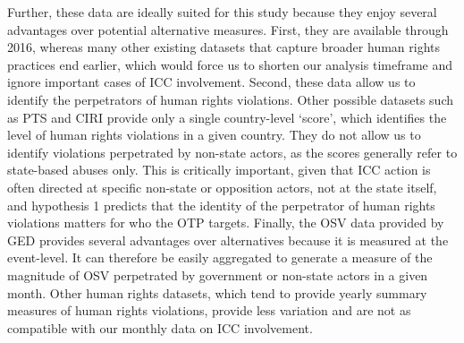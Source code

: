 Further, these data are ideally suited for this study because they enjoy several advantages over potential alternative measures. First, they are available through 2016, whereas many other existing datasets that capture broader human rights practices end earlier, which would force us to shorten our analysis timeframe and ignore important cases of ICC involvement. Second, these data allow us to identify the perpetrators of human rights violations. Other possible datasets such as PTS and CIRI provide only a single country-level `score', which identifies the level of human rights violations in a given country. They do not allow us to identify violations perpetrated by non-state actors, as the scores generally refer to state-based abuses only. This is critically important, given that ICC action is often directed at specific non-state or opposition actors, not at the state itself, and hypothesis 1 predicts that the identity of the perpetrator of human rights violations matters for who the OTP targets. Finally, the OSV data provided by GED provides several advantages over alternatives because it is measured at the event-level. It can therefore be easily aggregated to generate a measure of the magnitude of OSV perpetrated by government or non-state actors in a given month. Other human rights datasets, which tend to provide yearly summary measures of human rights violations, provide less variation and are not as compatible with our monthly data on ICC involvement.


